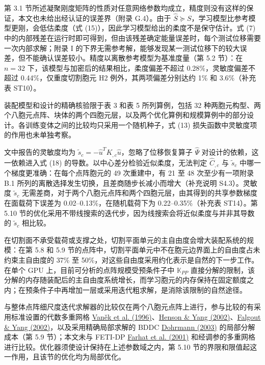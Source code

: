\documentclass[preprint,12pt,authoryear]{elsarticle}
\begin{document}
第 3.1 节所述凝聚刚度矩阵的性质对任意网络参数均成立，精度则没有这样的保证，本文也未给出经认证的误差界（附录 G.4）。由于 \(\widehat S\succeq S\)，学习模型比参考模型更刚，会低估柔度（式 (15)），因此学习模型给出的柔度不是保守估计。式 (7) 中的内部残差在运行时即可得到，但由该残差确定能量误差时，每个测试位移需要一次内部求解；附录 I 的下界无需参考解，能够发现某一测试位移下的较大误差，但不能确认误差较小。精度以离散参考模型为基准度量（第 5.2 节）：在 \(n=32\) 下，该模型与加密后的结果相比，柔度偏差不超过 0.28\%，灵敏度偏差不超过 0.44\%，仅重度切割胞元 H2 例外，其两项偏差分别达约 1\% 和 3.6\%（补充表 ST10）。

装配模型和设计的精确核验限于表 3 和表 5 所列算例，包括 32 种两胞元构型、两个八胞元点阵、块体的两个四胞元层，以及两个优化算例和规模算例中的部分设计。各训练变体之间的比较均只采用一个随机种子，式 (13) 损失函数中灵敏度项的作用也未单独考察。

文中报告的灵敏度均为 \(\widetilde s_c=-\widehat u^TK_{,c}\widehat u\)，忽略了位移恢复算子 \(\widehat\Psi\) 对设计的依赖，这一依赖进入式 (18) 的导数。以中心差分检验近似柔度，无法判定 \(\widehat C_{,c}\) 与 \(\widetilde s_c\) 中哪一个梯度更准确：在每个点阵胞元的 49 次重建中，有 21 至 48 次至少有一项附录 B.1 所列的离散选择发生切换，且差商随步长减小而增大（补充说明 S4.3）。灵敏度 \(\widetilde s_c\) 无需差商，对于两个八胞元点阵和两个四胞元层，由其得到的共享参数梯度在面载荷下误差为 0.02--0.13\%，在随机载荷下为 0.22--0.35\%（补充表 ST14）。第 5.10 节的优化采用不带线搜索的迭代步，因为线搜索会将近似柔度与并非其导数的 \(\widetilde s_c\) 相比较。

在切割面不承受载荷或支撑之处，切割平面单元的主自由度会增大装配系统的规模：在第 5.8 和 5.9 节的点阵中，切割平面单元中不在胞元边界面上的自由度占未约束主自由度的 37\% 至 50\%，对这些自由度采用约化表示是自然的下一步工作。在单个 GPU 上，目前可分析的点阵规模受预条件子中 \(\mathbb K_{PP}\) 直接分解的限制，该分解的内存随装配后的主自由度系统增长，而学习胞元的内存保持在固定额度之内；在预条件子中再增加一层或采用迭代粗求解，是消除该限制的自然途径。

与整体点阵细尺度迭代求解器的比较仅在两个八胞元点阵上进行，参与比较的有采用标准设置的代数多重网格 \href{https://doi.org/10.1007/BF02238511}{Vaněk et al. (1996)}、\href{https://doi.org/10.1016/S0168-9274(01)00115-5}{Henson \& Yang (2002)}、\href{https://doi.org/10.1007/3-540-47789-6_66}{Falgout \& Yang (2002)}，以及采用精确局部求解的 BDDC \href{https://doi.org/10.1137/S1064827502412887}{Dohrmann (2003)} 的局部分解成本（第 5.9 节）；本文未与 FETI-DP \href{https://doi.org/10.1002/nme.76}{Farhat et al. (2001)} 和经调参的多重网格进行比较。优化器须使设计保持在上述参数域之内，第 5.10 节的界限和限值起这一作用，且该节的优化均为局部优化。
\end{document}
